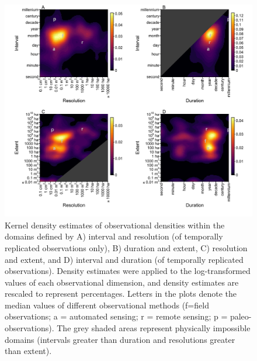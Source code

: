 \documentclass[12pt]{article}
\begin{document}

\begin{figure}[!ht]
\includegraphics[width=1\textwidth]{../vignettes/figures/fig2.png}
\vspace{-0.15 cm}
\caption{Kernel density estimates of observational densities within the domains defined by A) interval and resolution (of temporally replicated observations only), B) duration and extent, C) resolution and extent, and D) interval and duration (of temporally replicated observations). Density estimates were applied to the log-transformed values of each observational dimension, and density estimates are rescaled to represent percentages. Letters in the plots denote the median values of different observational methods (f=field observations; a = automated sensing; r = remote sensing; p = paleo-observations). The grey shaded areas represent physically impossible domains (intervals greater than duration and resolutions greater than extent).}
\label{afoto1}
\end{figure}
\end{document}
